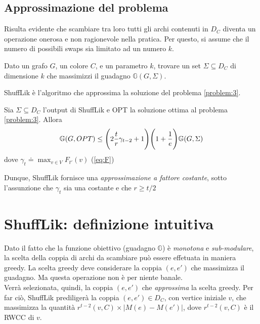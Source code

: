 \subsection{Approssimazione del problema}
Risulta evidente che scambiare tra loro tutti gli archi contenuti in $D_C$ diventa un operazione onerosa e non ragionevole nella pratica.
Per questo, si assume che il numero di possibili swaps sia limitato ad un numero $k$.
\begin{problem}\label{problem:3}
    Dato un grafo $G$, un colore $C$, e un parametro $k$, trovare un set $\Sigma \subseteq D_C$ di dimensione $k$ che 
    massimizzi il guadagno $\mathbb{G}{(G,\Sigma)}$. 
\end{problem}
ShuffLik è l'algoritmo che approssima la soluzione del problema \ref{problem:3}.
\begin{theorem}
    Sia $\Sigma \subseteq D_C$ l'output di ShuffLik e OPT la soluzione ottima al problema \ref{problem:3}. Allora
    \begin{equation}
        \mathbb{G}(G,OPT) \le \Bigg(2{t\over{r}}\gamma_{t-2}+1\Bigg)\Bigg(1+{1\over{e}}\Bigg)\mathbb{G}(G,\Sigma)
    \end{equation}
    dove $\gamma_t\doteq \max_{v\in V} F_{t'}(v)$ (\ref{eq:F})
\end{theorem}
Dunque, ShuffLik fornisce una \emph{approssimazione a fattore costante}, sotto l'assunzione che $\gamma_t$ 
sia una costante e che $r \ge t/2$
\section{ShuffLik: definizione intuitiva}
Dato il fatto che la funzione obiettivo (guadagno $\mathbb{G}$) è \emph{monotona} e \emph{sub-modulare}, la scelta
della coppia di archi da scambiare può essere effetuata in maniera greedy. La scelta greedy deve considerare la coppia $(e,e')$ che massimizza il guadagno.
Ma questa operazione non è per niente banale.\\ 
Verrà selezionata, quindi, la coppia $(e,e')$ che \emph{approssima} la scelta greedy.
Per far ciò, ShuffLik prediligerà la coppia $(e,e') \in D_C$, con vertice iniziale $v$, che massimizza 
la quantità $r^{t-2}(v,C)\times |M(e)-M(e')|$, dove $r^{t-2}(v,C)$ è il RWCC di $v$.
